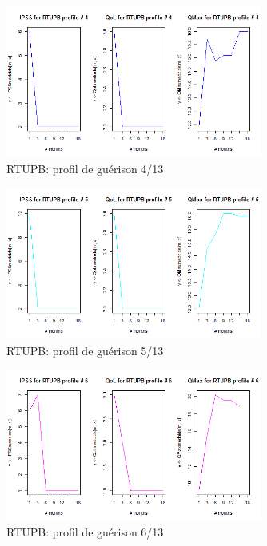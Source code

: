 \begin{figure}[H]
\centering
\includegraphics[width=0.75\textwidth]{../Fig/RTUPB/rtupb-profil-post-04.png}
\caption{RTUPB: profil de guérison 4/13}
\end{figure}

\begin{figure}[H]
\centering
\includegraphics[width=0.75\textwidth]{../Fig/RTUPB/rtupb-profil-post-05.png}
\caption{RTUPB: profil de guérison 5/13}
\end{figure}

\begin{figure}[H]
\centering
\includegraphics[width=0.75\textwidth]{../Fig/RTUPB/rtupb-profil-post-06.png}
\caption{RTUPB: profil de guérison 6/13}
\end{figure}

